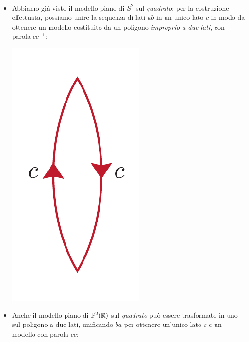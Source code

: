\begin{examples}~{}
	\begin{itemize}
		\item Abbiamo già visto il modello piano di $S^2$ sul \textit{quadrato}; per la costruzione effettuata, possiamo unire la sequenza di lati $ab$ in un unico lato $c$ in modo da ottenere un modello costituito da un poligono \textit{improprio a due lati}, con parola $cc^{-1}$:
		\begin{center}
			\includegraphics[trim=0cm 0cm 0cm 0cm, clip, scale=0.375]{images/sphere2lines.pdf}
		\end{center}
		\item Anche il modello piano di $\mathbb{P}^2(\mathbb{R})$ sul \textit{quadrato} può essere trasformato in uno sul poligono a due lati, unificando $ba$ per ottenere un'unico lato $c$ e un modello con parola $cc$:
		\begin{center}

\end{center}
\end{itemize}
\end{examples}
